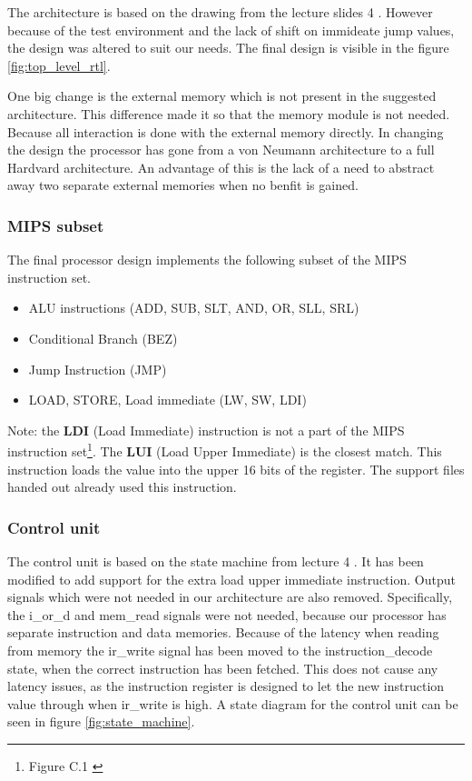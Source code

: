 The architecture is based on the drawing from the lecture slides 4 \cite{lecture-4}.
However because of the test environment and the lack of shift on immideate jump values,
the design was altered to suit our needs.
The final design is visible in the figure \ref{fig:top_level_rtl}.

One big change is the external memory which is not present in the suggested architecture.
This difference made it so that the memory module is not needed.
Because all interaction is done with the external memory directly.
In changing the design the processor has gone from a von Neumann architecture to a full Hardvard architecture.
An advantage of this is the lack of a need to abstract away two separate external memories when no benfit is gained.

\subsubsection{MIPS subset}

The final processor design implements the following subset of the MIPS instruction set.

\begin{itemize}
    \item ALU instructions (ADD, SUB, SLT, AND, OR, SLL, SRL)
    \item Conditional Branch (BEZ)
    \item Jump Instruction (JMP)
    \item LOAD, STORE, Load immediate (LW, SW, LDI)
\end{itemize}

Note: the {\bf LDI} (Load Immediate) instruction is not a part of the MIPS instruction set\footnote{Figure C.1 \cite[p.66]{compendium}}.
The {\bf LUI} (Load Upper Immediate) is the closest match.
This instruction loads the value into the upper 16 bits of the register.
The support files handed out already used this instruction.

\subsubsection{Control unit}

The control unit is based on the state machine from lecture 4 \cite{lecture-4}.
It has been modified to add support for the extra load upper immediate instruction.
Output signals which were not needed in our architecture are also removed.
Specifically, the i\_or\_d and mem\_read signals were not needed, because our processor has separate instruction and data memories.
Because of the latency when reading from memory the ir\_write signal has been moved to the instruction\_decode state, when the correct instruction has been fetched.
This does not cause any latency issues, as the instruction register is designed to let the new instruction value through when ir\_write is high.
A state diagram for the control unit can be seen in figure \ref{fig:state_machine}.

